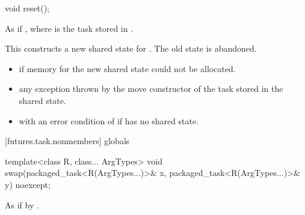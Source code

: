 %
\begin{itemdecl}
void reset();
\end{itemdecl}

\begin{itemdescr}
\pnum
\effects As if , where
 is the task stored in
. \begin{note} This constructs a new shared state for . The
old state is abandoned. \end{note}

\pnum
\throws
\begin{itemize}
\item {} if memory for the new shared state could not be allocated.
\item any exception thrown by the move constructor of the task stored in the shared
state.
\item {} with an error condition of  if 
has no shared state.
\end{itemize}
\end{itemdescr}

[futures.task.nonmembers]{ globals}

%
\begin{itemdecl}
template<class R, class... ArgTypes>
  void swap(packaged_task<R(ArgTypes...)>& x, packaged_task<R(ArgTypes...)>& y) noexcept;
\end{itemdecl}

\begin{itemdescr}
\pnum
\effects As if by .
\end{itemdescr}
